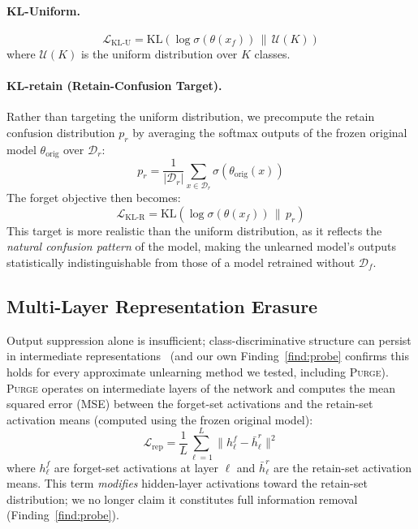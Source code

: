 \documentclass{article}
\newcommand{\ours}{\textsc{Purge}}
\newcommand{\new}[1]{{\color{orange}#1}}
\begin{document}
\paragraph{KL-Uniform.}
\begin{equation}
\mathcal{L}_{\text{KL-U}} = \text{KL}\!\left(\log\sigma(\theta(x_f)) \,\|\, \mathcal{U}(K)\right)
\end{equation}
where $\mathcal{U}(K)$ is the uniform distribution over $K$ classes.

\paragraph{KL-retain (Retain-Confusion Target).}
Rather than targeting the uniform distribution, we precompute the retain confusion distribution $p_r$ by averaging the softmax outputs of the frozen original model $\theta_{\text{orig}}$ over $\mathcal{D}_r$:
\begin{equation}\label{eq:retain_confuse}
p_r = \frac{1}{|\mathcal{D}_r|}\sum_{x \in \mathcal{D}_r} \sigma(\theta_{\text{orig}}(x))
\end{equation}
The forget objective then becomes:
\begin{equation}\label{eq:kl_retain}
\mathcal{L}_{\text{KL-R}} = \text{KL}\!\left(\log\sigma(\theta(x_f)) \,\|\, p_r\right)
\end{equation}
This target is more realistic than the uniform distribution, as it reflects the \emph{natural confusion pattern} of the model, making the unlearned model's outputs statistically indistinguishable from those of a model retrained without $\mathcal{D}_f$.

\subsection{Multi-Layer Representation Erasure}\label{sec:rep_erase}

Output suppression alone is insufficient; \new{class-discriminative structure can persist in intermediate representations~\cite{golatkar2020eternal} (and our own Finding~\ref{find:probe} confirms this holds for every approximate unlearning method we tested, including \ours{}).}
\ours{} operates on intermediate layers of the network and computes the mean squared error (MSE) between the forget-set activations and the retain-set activation means (computed using the frozen original model):
\begin{equation}
\mathcal{L}_{\text{rep}} = \frac{1}{L}\sum_{\ell=1}^{L} \|h_\ell^f - \bar{h}_\ell^r\|^2
\end{equation}
where $h_\ell^f$ are forget-set activations at layer $\ell$ and $\bar{h}_\ell^r$ are the retain-set activation means. \new{This term \emph{modifies} hidden-layer activations toward the retain-set distribution; we no longer claim it constitutes full information removal (Finding~\ref{find:probe}).}
\end{document}
